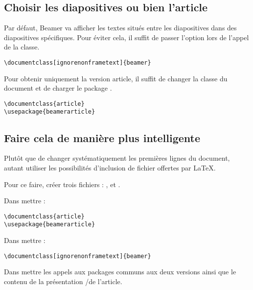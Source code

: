 \subsection{Choisir les diapositives ou bien l'article}

Par défaut, Beamer va afficher les textes situés entre les diapositives dans des diapositives spécifiques. Pour éviter cela, il suffit de passer l'option  lors de l'appel de la classe.

\begin{verbatim}
\documentclass[ignorenonframetext]{beamer}
\end{verbatim}

Pour obtenir uniquement la version article, il suffit de changer la classe du document et de charger le package .

\begin{verbatim}
\documentclass{article}
\usepackage{beamerarticle}
\end{verbatim}

\subsection{Faire cela de manière plus intelligente}

Plutôt que de changer systématiquement les premières lignes du document, autant utiliser les possibilités d'inclusion de fichier offertes par \LaTeX{}. 

Pour ce faire, créer trois fichiers :  ,  et .

Dans  mettre :

\begin{verbatim}
\documentclass{article}
\usepackage{beamerarticle}

\end{verbatim}

Dans  mettre :

\begin{verbatim}
\documentclass[ignorenonframetext]{beamer}

\end{verbatim}

Dans  mettre les appels aux packages communs aux deux versions ainsi que le contenu de la présentation /de l'article.



